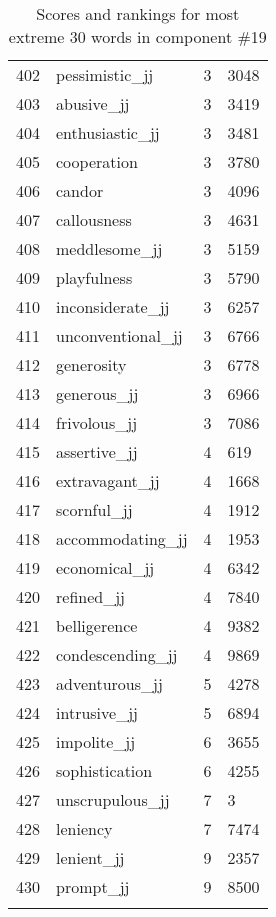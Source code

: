 \begin{longtable}[!htbp]{| rlr@{.}l |}
    402 & pessimistic\_jj & 3 & 3048 \\
    403 & abusive\_jj & 3 & 3419 \\
    404 & enthusiastic\_jj & 3 & 3481 \\
    405 & cooperation & 3 & 3780 \\
    406 & candor & 3 & 4096 \\
    407 & callousness & 3 & 4631 \\
    408 & meddlesome\_jj & 3 & 5159 \\
    409 & playfulness & 3 & 5790 \\
    410 & inconsiderate\_jj & 3 & 6257 \\
    411 & unconventional\_jj & 3 & 6766 \\
    412 & generosity & 3 & 6778 \\
    413 & generous\_jj & 3 & 6966 \\
    414 & frivolous\_jj & 3 & 7086 \\
    415 & assertive\_jj & 4 & 619 \\
    416 & extravagant\_jj & 4 & 1668 \\
    417 & scornful\_jj & 4 & 1912 \\
    418 & accommodating\_jj & 4 & 1953 \\
    419 & economical\_jj & 4 & 6342 \\
    420 & refined\_jj & 4 & 7840 \\
    421 & belligerence & 4 & 9382 \\
    422 & condescending\_jj & 4 & 9869 \\
    423 & adventurous\_jj & 5 & 4278 \\
    424 & intrusive\_jj & 5 & 6894 \\
    425 & impolite\_jj & 6 & 3655 \\
    426 & sophistication & 6 & 4255 \\
    427 & unscrupulous\_jj & 7 & 3 \\
    428 & leniency & 7 & 7474 \\
    429 & lenient\_jj & 9 & 2357 \\
    430 & prompt\_jj & 9 & 8500 \\
    \hline
    \caption{Scores and rankings for most extreme 30 words in component \#19} \\
\end{longtable}
